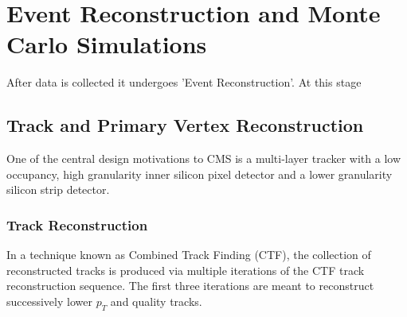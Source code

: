\chapter{Event Reconstruction and Monte Carlo Simulations}
After data is collected it undergoes 'Event Reconstruction'.
At this stage %
\section{Track and Primary Vertex Reconstruction}
One of the central design motivations to CMS%
is a multi-layer tracker with a low occupancy, high granularity
inner silicon pixel detector and a lower granularity silicon strip detector.
\subsection{Track Reconstruction}
\label{sec:TrackReco}
In a technique known as Combined Track Finding (CTF),
the collection of reconstructed tracks is produced via
multiple iterations of the CTF track reconstruction sequence.
The first three iterations are meant to reconstruct successively
lower $p_{T}$ and quality tracks.%

